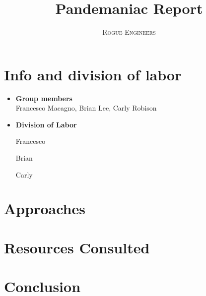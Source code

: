 \documentclass{article}
\title{Pandemaniac Report}
\author{\textsc{Rogue Engineers}}
\date
\begin{document}
\pagestyle{fancy}

\maketitle

\section{Info and division of labor}
\medskip
\begin{itemize}
    \item \textbf{Group members} \\
    Francesco Macagno, Brian Lee, Carly Robison
    
    \item \textbf{Division of Labor}
    
    Francesco
    
    Brian
    
    Carly

\end{itemize}

\section{Approaches}
\medskip
\begin{itemize}


\end{itemize}

\section{Resources Consulted}

\section{Conclusion}
\end{document}
